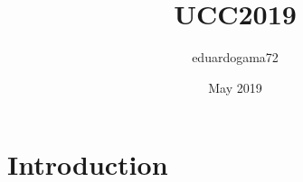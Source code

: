 \documentclass{article}
\title{UCC2019}
\author{eduardogama72 }
\date{May 2019}
\begin{document}
\maketitle

\section{Introduction}
\end{document}
